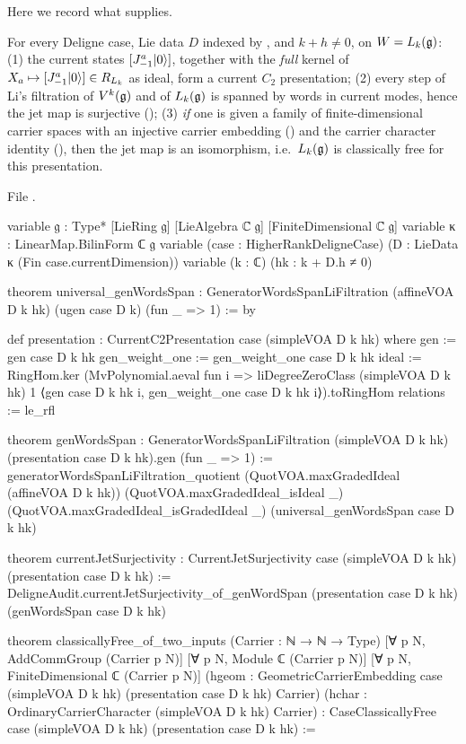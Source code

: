 Here we record what  supplies.

\begin{theorem}\label{l23:thm:deligneinstance}
For every Deligne case, Lie data $D$ indexed by , and $k+h\ne0$, on $W=L_k(\mathfrak g)$:
(1) the current states $[J^a_{-1}|0\rangle]$, together with the \emph{full} kernel of $X_a\mapsto[J^a_{-1}|0\rangle]\in R_{L_k}$ as ideal,
form a current $C_2$ presentation; (2) every step of Li's filtration of $V^k(\mathfrak g)$ and of $L_k(\mathfrak g)$ is spanned by words in current modes,
hence the jet map is surjective (); (3) \emph{if} one is given a family of finite-dimensional carrier spaces
with an injective carrier embedding () and the carrier character identity (), then the jet map is an isomorphism,
i.e.\ $L_k(\mathfrak g)$ is classically free for this presentation.
\end{theorem}
\noindent File .
\begin{leancode}
variable {𝔤 : Type*} [LieRing 𝔤] [LieAlgebra ℂ 𝔤] [FiniteDimensional ℂ 𝔤]
variable {κ : LinearMap.BilinForm ℂ 𝔤}
variable (case : HigherRankDeligneCase) (D : LieData κ (Fin case.currentDimension))
variable (k : ℂ) (hk : k + D.h ≠ 0)

theorem universal_genWordsSpan :
    GeneratorWordsSpanLiFiltration (affineVOA D k hk) (ugen case D k) (fun _ => 1) := by

def presentation : CurrentC2Presentation case (simpleVOA D k hk) where
  gen := gen case D k hk
  gen_weight_one := gen_weight_one case D k hk
  ideal := RingHom.ker
    (MvPolynomial.aeval fun i =>
      liDegreeZeroClass (simpleVOA D k hk) 1 ⟨gen case D k hk i, gen_weight_one case D k hk i⟩).toRingHom
  relations := le_rfl

theorem genWordsSpan :
    GeneratorWordsSpanLiFiltration (simpleVOA D k hk) (presentation case D k hk).gen (fun _ => 1) :=
  generatorWordsSpanLiFiltration_quotient (QuotVOA.maxGradedIdeal (affineVOA D k hk))
    (QuotVOA.maxGradedIdeal_isIdeal _) (QuotVOA.maxGradedIdeal_isGradedIdeal _)
    (universal_genWordsSpan case D k hk)

theorem currentJetSurjectivity : CurrentJetSurjectivity case (simpleVOA D k hk) (presentation case D k hk) :=
  DeligneAudit.currentJetSurjectivity_of_genWordSpan (presentation case D k hk)
    (genWordsSpan case D k hk)

theorem classicallyFree_of_two_inputs
    (Carrier : ℕ → ℕ → Type)
    [∀ p N, AddCommGroup (Carrier p N)]
    [∀ p N, Module ℂ (Carrier p N)]
    [∀ p N, FiniteDimensional ℂ (Carrier p N)]
    (hgeom : GeometricCarrierEmbedding case (simpleVOA D k hk) (presentation case D k hk) Carrier)
    (hchar : OrdinaryCarrierCharacter (simpleVOA D k hk) Carrier) :
    CaseClassicallyFree case (simpleVOA D k hk) (presentation case D k hk) :=
\end{leancode}

